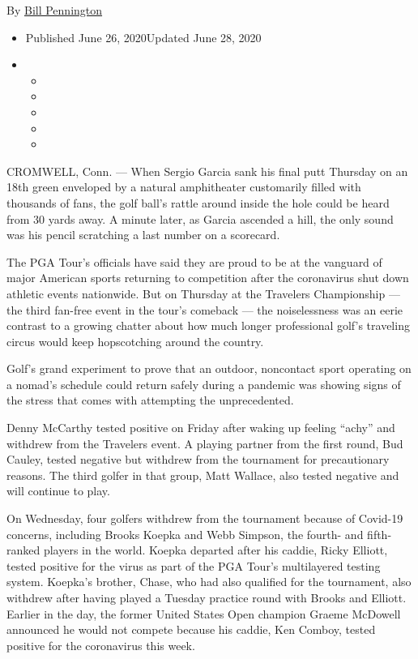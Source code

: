 By \href{https://www.nytimes.com/by/bill-pennington}{Bill Pennington}

\begin{itemize}
\item
  Published June 26, 2020Updated June 28, 2020
\item
  \begin{itemize}
  \item
  \item
  \item
  \item
  \item
  \end{itemize}
\end{itemize}

CROMWELL, Conn. --- When Sergio Garcia sank his final putt Thursday on
an 18th green enveloped by a natural amphitheater customarily filled
with thousands of fans, the golf ball's rattle around inside the hole
could be heard from 30 yards away. A minute later, as Garcia ascended a
hill, the only sound was his pencil scratching a last number on a
scorecard.

The PGA Tour's officials have said they are proud to be at the vanguard
of major American sports returning to competition after the coronavirus
shut down athletic events nationwide. But on Thursday at the Travelers
Championship --- the third fan-free event in the tour's comeback --- the
noiselessness was an eerie contrast to a growing chatter about how much
longer professional golf's traveling circus would keep hopscotching
around the country.

Golf's grand experiment to prove that an outdoor, noncontact sport
operating on a nomad's schedule could return safely during a pandemic
was showing signs of the stress that comes with attempting the
unprecedented.

Denny McCarthy tested positive on Friday after waking up feeling
``achy'' and withdrew from the Travelers event. A playing partner from
the first round, Bud Cauley, tested negative but withdrew from the
tournament for precautionary reasons. The third golfer in that group,
Matt Wallace, also tested negative and will continue to play.

On Wednesday, four golfers withdrew from the tournament because of
Covid-19 concerns, including Brooks Koepka and Webb Simpson, the fourth-
and fifth-ranked players in the world. Koepka departed after his caddie,
Ricky Elliott, tested positive for the virus as part of the PGA Tour's
multilayered testing system. Koepka's brother, Chase, who had also
qualified for the tournament, also withdrew after having played a
Tuesday practice round with Brooks and Elliott. Earlier in the day, the
former United States Open champion Graeme McDowell announced he would
not compete because his caddie, Ken Comboy, tested positive for the
coronavirus this week.


